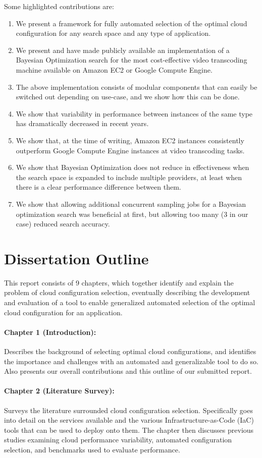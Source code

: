 \documentclass{report}
\begin{document}
Some highlighted contributions are:
\begin{enumerate}
\item We present a framework for fully automated selection of the optimal cloud configuration for any search space and any type of application.
\item We present and have made publicly available an implementation of a Bayesian Optimization search for the most cost-effective video transcoding machine available on Amazon EC2 or Google Compute Engine.
\item The above implementation consists of modular components that can easily be switched out depending on use-case, and we show how this can be done.
\item We show that variability in performance between instances of the same type has dramatically decreased in recent years.
\item We show that, at the time of writing, Amazon EC2 instances consistently outperform Google Compute Engine instances at video transcoding tasks.
\item We show that Bayesian Optimization does not reduce in effectiveness when the search space is expanded to include multiple providers, at least when there is a clear performance difference between them.
\item We show that allowing additional concurrent sampling jobs for a Bayesian optimization search was beneficial at first, but allowing too many (3 in our case) reduced search accuracy.
\end{enumerate}
 
\section{Dissertation Outline}
This report consists of 9 chapters, which together identify and explain the problem of cloud configuration selection, eventually describing the development and evaluation of a tool to enable generalized automated selection of the optimal cloud configuration for an application.

\paragraph{Chapter 1 (Introduction):} Describes the background of selecting optimal cloud configurations, and identifies the importance and challenges with an automated and generalizable tool to do so. Also presents our overall contributions and this outline of our submitted report.
\paragraph{Chapter 2 (Literature Survey):} Surveys the literature surrounded cloud configuration selection. Specifically goes into detail on the services available and the various Infrastructure-as-Code (IaC) tools that can be used to deploy onto them. The chapter then discusses previous studies examining cloud performance variability, automated configuration selection, and benchmarks used to evaluate performance. 
\end{document}

